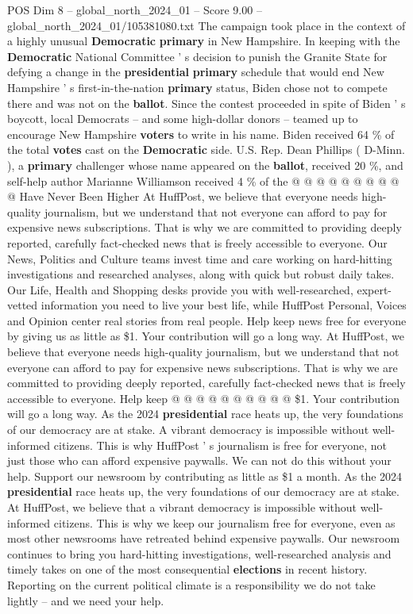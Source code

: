 \begin{textsample}{POS Dim 8 – global\_north\_2024\_01 – Score 9.00 – global\_north\_2024\_01/105381080.txt}
The campaign took place in the context of a highly unusual \textbf{Democratic} \textbf{primary} in New Hampshire.
In keeping with the \textbf{Democratic} National Committee ' s decision to punish the Granite State for defying a change in the \textbf{presidential} \textbf{primary} schedule that would end New Hampshire ' s first-in-the-nation \textbf{primary} status, Biden chose not to compete there and was not on the \textbf{ballot}.
Since the contest proceeded in spite of Biden ' s boycott, local Democrats -- and some high-dollar donors -- teamed up to encourage New Hampshire \textbf{voters} to write in his name.
Biden received 64 \% of the total \textbf{votes} cast on the \textbf{Democratic} side.
U.S.
Rep.
Dean Phillips ( D-Minn. ), a \textbf{primary} challenger whose name appeared on the \textbf{ballot}, received 20 \%, and self-help author Marianne Williamson received 4 \% of the @ @ @ @ @ @ @ @ @ @ Have Never Been Higher At HuffPost, we believe that everyone needs high-quality journalism, but we understand that not everyone can afford to pay for expensive news subscriptions.
That is why we are committed to providing deeply reported, carefully fact-checked news that is freely accessible to everyone.
Our News, Politics and Culture teams invest time and care working on hard-hitting investigations and researched analyses, along with quick but robust daily takes.
Our Life, Health and Shopping desks provide you with well-researched, expert-vetted information you need to live your best life, while HuffPost Personal, Voices and Opinion center real stories from real people.
Help keep news free for everyone by giving us as little as \$1.
Your contribution will go a long way.
At HuffPost, we believe that everyone needs high-quality journalism, but we understand that not everyone can afford to pay for expensive news subscriptions.
That is why we are committed to providing deeply reported, carefully fact-checked news that is freely accessible to everyone.
Help keep @ @ @ @ @ @ @ @ @ @ \$1.
Your contribution will go a long way.
As the 2024 \textbf{presidential} race heats up, the very foundations of our democracy are at stake.
A vibrant democracy is impossible without well-informed citizens.
This is why HuffPost ' s journalism is free for everyone, not just those who can afford expensive paywalls.
We can not do this without your help.
Support our newsroom by contributing as little as \$1 a month.
As the 2024 \textbf{presidential} race heats up, the very foundations of our democracy are at stake.
At HuffPost, we believe that a vibrant democracy is impossible without well-informed citizens.
This is why we keep our journalism free for everyone, even as most other newsrooms have retreated behind expensive paywalls.
Our newsroom continues to bring you hard-hitting investigations, well-researched analysis and timely takes on one of the most consequential \textbf{elections} in recent history.
Reporting on the current political climate is a responsibility we do not take lightly -- and we need your help.

\end{textsample}
